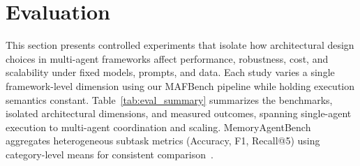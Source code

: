 \section{Evaluation}
\label{sec:eval}

This section presents controlled experiments that isolate how architectural design choices in multi-agent frameworks affect performance, robustness, cost, and scalability under fixed models, prompts, and data. Each study varies a single framework-level dimension using our MAFBench pipeline while holding execution semantics constant. Table~\ref{tab:eval_summary} summarizes the benchmarks, isolated architectural dimensions, and measured outcomes, spanning single-agent execution to multi-agent coordination and scaling. MemoryAgentBench aggregates heterogeneous subtask metrics (Accuracy, F1, Recall@5) using category-level means for consistent comparison~\cite{hu2025memoryagentbench}.








